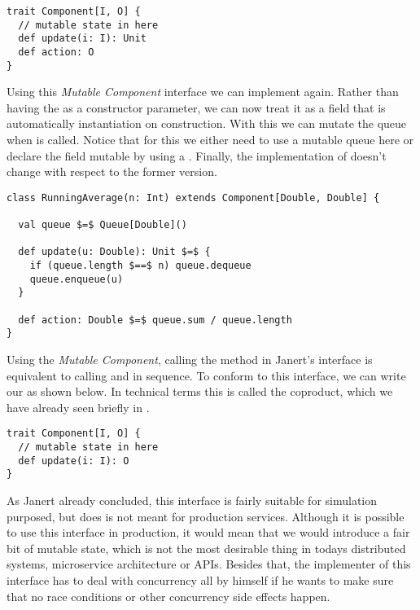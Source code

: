 \begin{lstlisting}[style=InlineScalaStyle]
trait Component[I, O] {
  // mutable state in here
  def update(i: I): Unit
  def action: O
}
\end{lstlisting}

Using this \textit{Mutable Component} interface we can implement  again. Rather than having the  as a constructor parameter, we can now treat it as a field that is automatically instantiation on construction. With this we can mutate the queue when  is called. Notice that for this we either need to use a mutable queue here or declare the field mutable by using a . Finally, the implementation of  doesn't change with respect to the former version.

\begin{lstlisting}[style=ScalaStyle]
class RunningAverage(n: Int) extends Component[Double, Double] {

  val queue $=$ Queue[Double]()

  def update(u: Double): Unit $=$ {
    if (queue.length $==$ n) queue.dequeue
    queue.enqueue(u)
  }

  def action: Double $=$ queue.sum / queue.length
}
\end{lstlisting}

Using the \textit{Mutable Component}, calling the  method in Janert's \comp interface is equivalent to calling  and  in sequence. To conform to this interface, we can write our \comp as shown below. In technical terms this is called the coproduct, which we have already seen briefly in .

\begin{lstlisting}[style=InlineScalaStyle]
trait Component[I, O] {
  // mutable state in here
  def update(i: I): O
}
\end{lstlisting}

As Janert already concluded, this interface is fairly suitable for simulation purposed, but does is not meant for production services. Although it is possible to use this interface in production, it would mean that we would introduce a fair bit of mutable state, which is not the most desirable thing in todays distributed systems, microservice architecture or APIs. Besides that, the implementer of this \comp interface has to deal with concurrency all by himself if he wants to make sure that no race conditions or other concurrency side effects happen.

